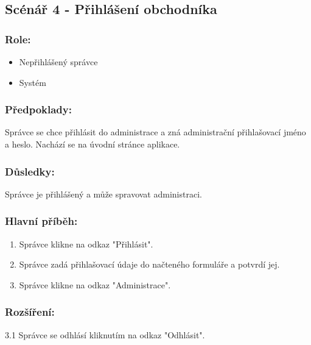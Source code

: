 \documentclass[11pt,twoside,a4paper]{book}
\begin{document}
\subsection{Scénář 4 - Přihlášení obchodníka}

\subsubsection*{Role:}

\begin{itemize}
\item Nepřihlášený správce
\item Systém
\end{itemize}

\subsubsection*{Předpoklady:}

Správce se chce přihlásit do administrace a zná administrační přihlašovací jméno a heslo. Nachází se na úvodní stránce aplikace.

\subsubsection*{Důsledky:}

Správce je přihlášený a může spravovat administraci.


\subsubsection*{Hlavní příběh:}

\begin{enumerate}
\item Správce klikne na odkaz "Přihlásit".
\item Správce zadá přihlašovací údaje do načteného formuláře a potvrdí jej.
\item Správce klikne na odkaz "Administrace".
\end{enumerate}

\subsubsection*{Rozšíření:}

\begin{description}
\item 3.1 Správce se odhlásí kliknutím na odkaz "Odhlásit".
\end{description}
\end{document}
